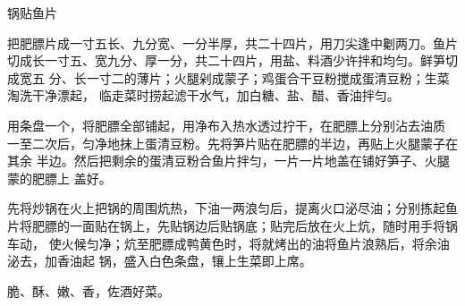 %
%
%
%
%
%
%
\begin{recipe}{锅贴鱼片}

\ingredients


\preparation

\step 把肥膘片成一寸五长、九分宽、一分半厚，共二十四片，用刀尖逢中劖两刀。鱼片
切成长一寸五、宽九分、厚一分，共二十四片，用盐、料酒少许拌和均匀。鲜笋切成宽五
分、长一寸二的薄片；火腿剁成蒙子；鸡蛋合干豆粉搅成蛋清豆粉；生菜淘洗干净漂起，
临走菜时捞起滤干水气，加白糖、盐、醋、香油拌匀。

\step 用条盘一个，将肥膘全部铺起，用净布入热水透过拧干，在肥膘上分别沾去油质
一至二次后，匀净地抹上蛋清豆粉。先将笋片贴在肥膘的半边，再贴上火腿蒙子在其余
半边。然后把剩余的蛋清豆粉合鱼片拌匀，一片一片地盖在铺好笋子、火腿蒙的肥膘上
盖好。

\step 先将炒锅在火上把锅的周围炕热，下油一两浪匀后，提离火口泌尽油；分别拣起鱼
片将肥膘的一面贴在锅上，先贴锅边后贴锅底；贴完后放在火上炕，随时用手将锅车动，
使火候匀净；炕至肥膘成鸭黄色时，将就烤出的油将鱼片浪熟后，将余油泌去，加香油起
锅，盛入白色条盘，镶上生菜即上席。

\features

脆、酥、嫩、香，佐酒好菜。

\end{recipe}

